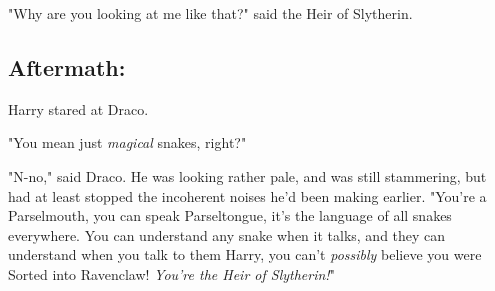{\el}

{\el}

{\el}

{\el}

"Why are you looking at me like that?" said the Heir of Slytherin.
\sbreak
\subsection{Aftermath:}

Harry stared at Draco.

"You mean just \emph{magical} snakes, right?"

"N-no," said Draco. He was looking rather pale, and was still stammering, but
had at least stopped the incoherent noises he'd been making earlier. "You're a
Parselmouth, you can speak Parseltongue, it's the language of all snakes
everywhere. You can understand any snake when it talks, and they can understand
when you talk to them{\el} Harry, you can't \emph{possibly} believe you were
Sorted into Ravenclaw! \emph{You're the Heir of Slytherin!}"

{\el}

{\el}

{\el}

{\el}

{\el}

